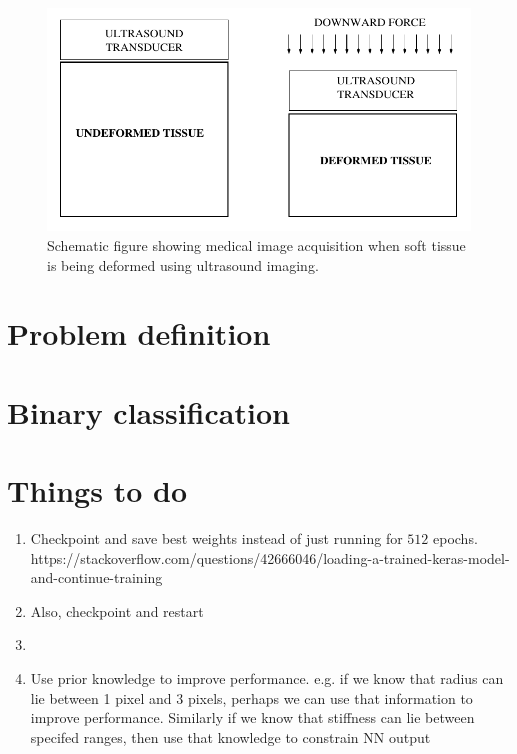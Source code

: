 \documentclass[12pt]{article}
\begin{document}
%
\begin{figure}
   \centering
    \includegraphics[totalheight=5cm]{Figures/prepostimage.png}
  \caption{\label{fig:prepostimage} Schematic figure showing medical image acquisition when soft tissue is being deformed using ultrasound imaging.}
\end{figure}
%
\section{Problem definition}
\section{Binary classification}





\section{Things to do}
\begin{enumerate}
\item{Checkpoint and save best weights instead of just running for $512$ epochs. https://stackoverflow.com/questions/42666046/loading-a-trained-keras-model-and-continue-training}
\item{Also, checkpoint and restart}
\item{}
\item{Use prior knowledge to improve performance. e.g. if we know that radius can lie between 1 pixel and 3 pixels, perhaps we can use that information to improve performance. Similarly if we know that stiffness can lie between specifed ranges, then use that knowledge to constrain NN output}
\end{enumerate}

{}

\end{document}
